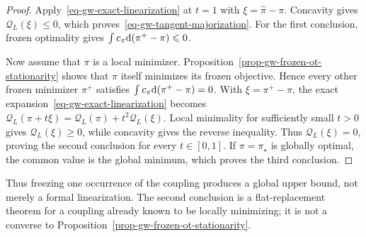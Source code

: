\begin{proof}
Apply~\eqref{eq-gw-exact-linearization} at $t=1$ with $\xi=\widehat\pi-\pi$. Concavity gives $\mathcal Q_L(\xi)\leq0$, which proves~\eqref{eq-gw-tangent-majorization}. For the first conclusion, frozen optimality gives $\int c_\pi\mathrm{d}(\pi^+-\pi)\leqslant0$.

Now assume that $\pi$ is a local minimizer. Proposition~\ref{prop-gw-frozen-ot-stationarity} shows that $\pi$ itself minimizes its frozen objective. Hence every other frozen minimizer $\pi^+$ satisfies
$\int c_\pi\mathrm{d}(\pi^+-\pi)=0$. With $\xi=\pi^+-\pi$, the exact expansion~\eqref{eq-gw-exact-linearization} becomes
$\mathcal Q_L(\pi+t\xi) = \mathcal Q_L(\pi)+t^2\mathcal Q_L(\xi)$.
Local minimality for sufficiently small $t>0$ gives $\mathcal Q_L(\xi)\geq0$, while concavity gives the reverse inequality. Thus $\mathcal Q_L(\xi)=0$, proving the second conclusion for every $t\in[0,1]$. If $\pi=\pi_\star$ is globally optimal, the common value is the global minimum, which proves the third conclusion.
\end{proof}
Thus freezing one occurrence of the coupling produces a global upper bound, not merely a formal linearization. The second conclusion is a flat-replacement theorem for a coupling already known to be locally minimizing; it is not a converse to Proposition~\ref{prop-gw-frozen-ot-stationarity}.

